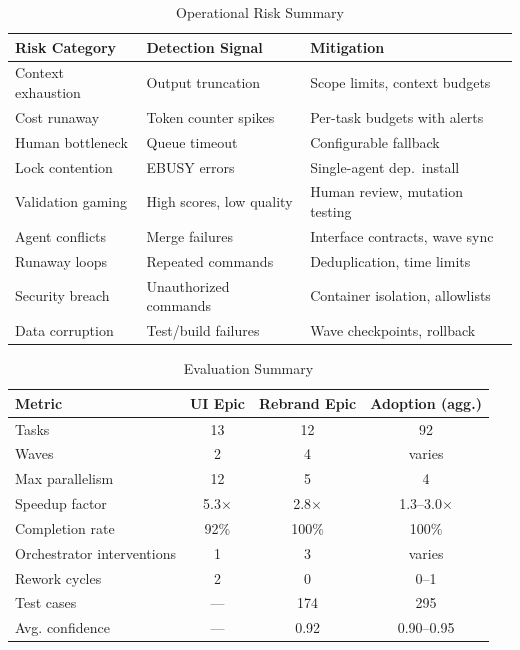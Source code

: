 \needspace{8cm}
\begin{table}[htbp]
\centering
\caption{Operational Risk Summary}
\label{tab:risk-summary}
\begin{tabular}{lll}
\toprule
\textbf{Risk Category} & \textbf{Detection Signal} & \textbf{Mitigation} \\
\midrule
Context exhaustion & Output truncation & Scope limits, context budgets \\
Cost runaway & Token counter spikes & Per-task budgets with alerts \\
Human bottleneck & Queue timeout & Configurable fallback \\
Lock contention & EBUSY errors & Single-agent dep.\ install \\
Validation gaming & High scores, low quality & Human review, mutation testing \\
Agent conflicts & Merge failures & Interface contracts, wave sync \\
Runaway loops & Repeated commands & Deduplication, time limits \\
Security breach & Unauthorized commands & Container isolation, allowlists \\
Data corruption & Test/build failures & Wave checkpoints, rollback \\
\bottomrule
\end{tabular}
\end{table}

\begin{table}[htbp]
\centering
\caption{Evaluation Summary}
\label{tab:summary}
\begin{tabular}{lccc}
\toprule
\textbf{Metric} & \textbf{UI Epic} & \textbf{Rebrand Epic} & \textbf{Adoption (agg.)} \\
\midrule
Tasks & 13 & 12 & 92 \\
Waves & 2 & 4 & varies \\
Max parallelism & 12 & 5 & 4 \\
Speedup factor & 5.3$\times$ & 2.8$\times$ & 1.3--3.0$\times$ \\
Completion rate & 92\% & 100\% & 100\% \\
Orchestrator interventions & 1 & 3 & varies \\
Rework cycles & 2 & 0 & 0--1 \\
Test cases & --- & 174 & 295 \\
Avg. confidence & --- & 0.92 & 0.90--0.95 \\
\bottomrule
\end{tabular}
\end{table}

